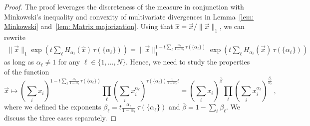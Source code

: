 \documentclass[aps,pra,11pt,onecolumn,nofootinbib,tightenlines]{revtex4-2}
\theoremstyle{definition}
\begin{document}
\begin{proof}
    The proof leverages the discreteness of the measure in conjunction with Minkowski's inequality and convexity of multivariate divergences in Lemma~\ref{lem: Minkowski} and~\ref{lem: Matrix majorization}.
    Using that $\hat{x}=\vec{x}/\|\vec{x}\|_1$, we can rewrite 
    \begin{align}
    \|\vec{x}\|_1 \exp\left( t\sum_\ell H_{\alpha_\ell}(\hat{x})\,\tau(\{\alpha_\ell\}) \right)
    = \|\vec{x}\|_1^{1 - t\sum_\ell\frac{\alpha_\ell}{1-\alpha_\ell} \,\tau(\{\alpha_\ell\})} \exp\left( t\sum_\ell H_{\alpha_\ell}(\vec{x}) \,\tau(\{\alpha_\ell\}) \right)
\end{align}
as long as $\alpha_\ell\neq 1$ for any $\ell\in\{1,\ldots,N\}$. Hence, we need to study the properties of the function
    \begin{equation}
    \vec{x} \longmapsto \left(\sum_{i} x_i \right)^{1 - t\sum_\ell \frac{\alpha_\ell}{1-\alpha_\ell} \, \tau(\{\alpha_\ell\})} \prod_{\ell} \left(\sum_{i} x_i^{\alpha_\ell} \right)^{\tau(\{\alpha_\ell\})\frac{1}{1-\alpha_\ell}t}  = \left(\sum_{i} x_i \right)^{\bar{\beta}} \prod_{\ell} \left(\sum_{i} x_i^{\alpha_\ell} \right)^{\frac{\beta_\ell}{\alpha_\ell}}\,,
    \end{equation}
    where we defined the exponents $\beta_\ell = t\frac{\alpha_\ell}{1-\alpha_\ell} \, \tau(\{\alpha_\ell\})$ and $\bar{\beta}= 1 - \sum_\ell \beta_\ell $. We discuss the three cases separately. 

\bigskip


\end{proof}
\end{document}
